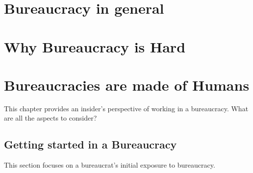 \documentclass{book}
\begin{document}
  \clearpage
    
    
    
     
  \clearpage
  \clearpage %

\chapter{Bureaucracy in general\label{sec:bureaucracy-in-general}}
   
  \clearpage
   
  \clearpage
  
  
  \clearpage
   
  \clearpage
   
  \clearpage

\chapter{Why Bureaucracy is Hard}
  \clearpage
  \clearpage
  \clearpage


\chapter{Bureaucracies are made of Humans\label{b_made_of_humans}}

This chapter provides an insider's perspective of working in a bureaucracy. What are all the aspects to consider?

  \section{Getting started in a Bureaucracy}
    This section focuses on a bureaucrat's initial exposure to bureaucracy. 
  
    
    
    
    
    
    
    
    
    
    
    
  \clearpage
\end{document}
